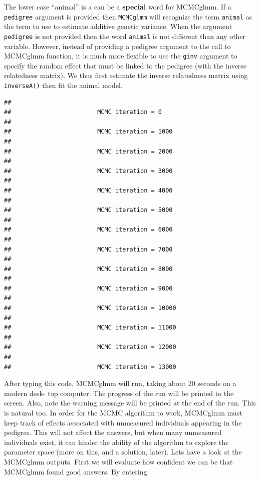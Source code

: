 \documentclass[
  12pt,
]{book}
\newenvironment{Shaded}{\begin{snugshade}}{\end{snugshade}}
\newcommand{\DataTypeTok}[1]{\textcolor[rgb]{0.13,0.29,0.53}{#1}}
\newcommand{\DecValTok}[1]{\textcolor[rgb]{0.00,0.00,0.81}{#1}}
\newcommand{\FloatTok}[1]{\textcolor[rgb]{0.00,0.00,0.81}{#1}}
\newcommand{\KeywordTok}[1]{\textcolor[rgb]{0.13,0.29,0.53}{\textbf{#1}}}
\newcommand{\NormalTok}[1]{#1}
\newcommand{\OperatorTok}[1]{\textcolor[rgb]{0.81,0.36,0.00}{\textbf{#1}}}
\newcommand{\StringTok}[1]{\textcolor[rgb]{0.31,0.60,0.02}{#1}}
\begin{document}
The lower case ``animal'' is a can be a \textbf{special} word for MCMCglmm. If a \texttt{pedigree} argument is provided then \texttt{MCMCglmm} will recognize the term \texttt{animal} as the term to use to estimate additive genetic variance. When the argument \texttt{pedigree} is not provided then the word \texttt{animal} is not different than any other variable. However, instead of providing a pedigree argument to the call to MCMCglmm function, it is much more flexible to use the \texttt{ginv} argument to specify the random effect that must be linked to the pedigree (with the inverse relatedness matrix). We thus first estimate the inverse relatedness matrix using \texttt{inverseA()} then fit the animal model.

\begin{Shaded}
\end{Shaded}

\begin{verbatim}
## 
##                        MCMC iteration = 0
## 
##                        MCMC iteration = 1000
## 
##                        MCMC iteration = 2000
## 
##                        MCMC iteration = 3000
## 
##                        MCMC iteration = 4000
## 
##                        MCMC iteration = 5000
## 
##                        MCMC iteration = 6000
## 
##                        MCMC iteration = 7000
## 
##                        MCMC iteration = 8000
## 
##                        MCMC iteration = 9000
## 
##                        MCMC iteration = 10000
## 
##                        MCMC iteration = 11000
## 
##                        MCMC iteration = 12000
## 
##                        MCMC iteration = 13000
\end{verbatim}

After typing this code, MCMCglmm will run, taking about 20 seconds on a modern desk- top computer. The progress of the run will be printed to the screen. Also, note the warning message will be printed at the end of the run. This is natural too. In order for the MCMC algorithm to work, MCMCglmm must keep track of effects associated with unmeasured individuals appearing in the pedigree. This will not affect the answers, but when many unmeasured individuals exist, it can hinder the ability of the algorithm to explore the parameter space (more on this, and a solution, later). Lets have a look at the MCMCglmm outputs. First we will evaluate how confident we can be that MCMCglmm found good answers. By entering
\end{document}

